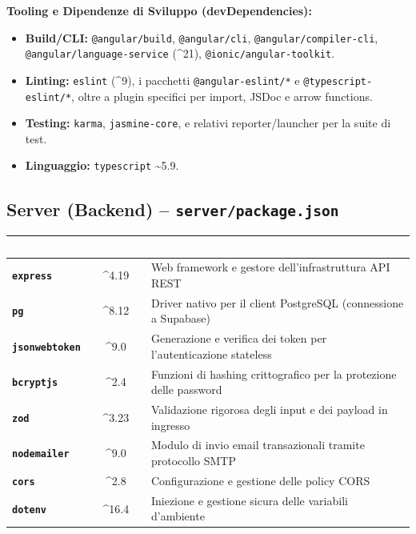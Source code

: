\textbf{Tooling e Dipendenze di Sviluppo (devDependencies):}
\begin{itemize}[itemsep=-2pt]
    \item \textbf{Build/CLI:} \texttt{@angular/build}, \texttt{@angular/cli}, \texttt{@angular/\allowbreak{}compiler-cli}, \texttt{@angular/\allowbreak{}language-service} (\textasciicircum{}21), \texttt{@ionic/\allowbreak{}angular-toolkit}.
    \item \textbf{Linting:} \texttt{eslint} (\textasciicircum{}9), i pacchetti \texttt{@angular-eslint/*} e \texttt{@typescript-eslint/*}, oltre a plugin specifici per import, JSDoc e arrow functions.
    \item \textbf{Testing:} \texttt{karma}, \texttt{jasmine-core}, e relativi reporter/launcher per la suite di test.
    \item \textbf{Linguaggio:} \texttt{typescript} \textasciitilde{}5.9.
\end{itemize}

\subsection{Server (Backend) -- \texttt{server/package.json}}
\begin{table}[H]
\centering
{}
\renewcommand{\arraystretch}{1.3}
\begin{tabularx}{\textwidth}{|l|c|X|}
\hline
\rowcolor[HTML]{3B3766}
\textcolor{white}{\textbf{Libreria}} & \textcolor{white}{\textbf{Versione}} & \textcolor{white}{\textbf{Scopo}} \\ \hline
\textbf{\texttt{express}} & \textasciicircum{}4.19 & Web framework e gestore dell'infrastruttura API REST \\ \hline
\textbf{\texttt{pg}} & \textasciicircum{}8.12 & Driver nativo per il client PostgreSQL (connessione a Supabase) \\ \hline
\textbf{\texttt{jsonwebtoken}} & \textasciicircum{}9.0 & Generazione e verifica dei token per l'autenticazione stateless \\ \hline
\textbf{\texttt{bcryptjs}} & \textasciicircum{}2.4 & Funzioni di hashing crittografico per la protezione delle password \\ \hline
\textbf{\texttt{zod}} & \textasciicircum{}3.23 & Validazione rigorosa degli input e dei payload in ingresso \\ \hline
\textbf{\texttt{nodemailer}} & \textasciicircum{}9.0 & Modulo di invio email transazionali tramite protocollo SMTP \\ \hline
\textbf{\texttt{cors}} & \textasciicircum{}2.8 & Configurazione e gestione delle policy CORS \\ \hline
\textbf{\texttt{dotenv}} & \textasciicircum{}16.4 & Iniezione e gestione sicura delle variabili d'ambiente \\ \hline
\end{tabularx}
\end{table}

